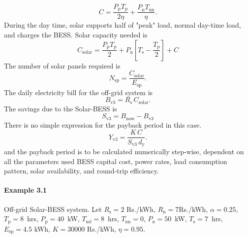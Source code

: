 \documentclass[a4paper]{article}
\begin{document}
\begin{equation}
    C = \frac{P_\text{p} T_\text{p} }{2 \eta} + \frac{P_\text{n} T_\text{nn} }{\eta}.
\end{equation}
During the day time, solar supports half of "peak" load, normal day-time load,
and charges the BESS.  Solar capacity needed is
\begin{equation}
    \label{eq:cs}
   C_\text{solar} = 
        \frac{P_\text{p} T_\text{p} }{2} + P_\text{n}  \left[T_\text{s} - \frac{T_\text{p}}{2} \right] + C
\end{equation}
The number of solar panels required is
\begin{equation}
    N_\text{sp} = \frac{C_\text{solar}}{E_\text{sp}}.
\end{equation}
The daily electricity bill for the off-grid system is
\begin{equation}
    B_\text{v3} = R_\text{s} \, C_\text{solar}.
\end{equation}
The savings due to the Solar-BESS is
\begin{equation}
    S_\text{v3} = B_\text{now} - B_\text{v3} 
\end{equation}
There is no simple expression for the payback period in this case.
\begin{equation}
    Y_\text{v3} = \frac{K \, C}{S_\text{v3} \, d_\text{y}}.
\end{equation}
and the payback period is to be calculated numerically step-wise, dependent
on all the parameters used BESS capital cost, power rates, load 
consumption pattern, solar availability, and round-trip efficiency.

\paragraph{Example 3.1} Off-grid Solar-BESS system.
Let $R_{\text{s}} = 2$ Rs./kWh, $R_\text{n} = 7$Rs./kWh, $\alpha=0.25$,
$T_\text{p}=8$~hrs, $P_\text{p} = 40$~kW, $T_\text{nd}=8$~hrs, $T_\text{nn}=0$,
$P_\text{n} = 50$~kW, $T_{\text{s}} = 7$~hrs, $E_{\text{sp}} = 4.5$ kWh, $K =
30000$ Rs./kWh, $\eta = 0.95$. 
\end{document}
